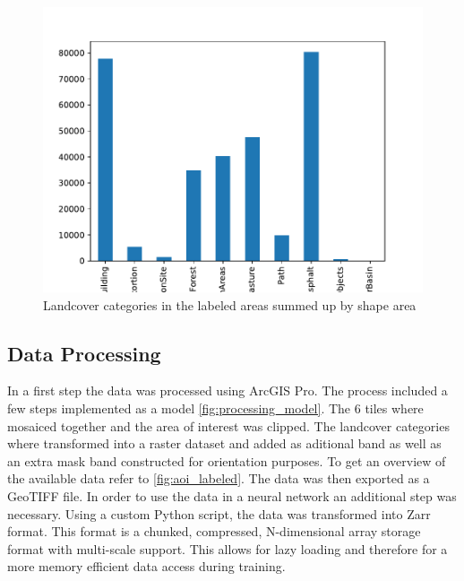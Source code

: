 \begin{figure}[H]
    \centering
    \captionsetup{width=0.8\linewidth}
    \includegraphics[scale=0.6]{figures/area_by_category.pdf}
    \caption{Landcover categories in the labeled areas summed up by shape area}
    \label{fig:landcover_categories}
\end{figure}

\subsection{Data Processing}%

In a first step the data was processed using ArcGIS Pro. The process included a few steps implemented as
a model \autoref{fig:processing_model}. The 6 tiles where mosaiced together and the area of interest 
was clipped. The landcover categories where transformed into a raster dataset and added as aditional
band as well as an extra mask band constructed for orientation purposes. To get an overview of the
available data refer to \autoref{fig:aoi_labeled}. The data was then exported as a GeoTIFF file.
In order to use the data in a neural network an additional step was necessary. Using a custom Python script,
the data was transformed into Zarr format. This format is a chunked, compressed, N-dimensional array
storage format with multi-scale support. This allows for lazy loading and therefore for a more memory
efficient data access during training.

